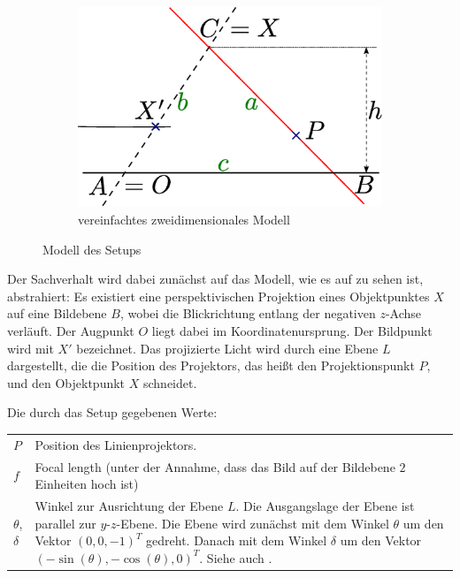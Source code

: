 \documentclass[ngerman,a4paper,parskip=half]{scrartcl}
\begin{document}
\begin{figure}
	\begin{subfigure}{0.45\textwidth}
		\includegraphics[width=\textwidth]{includes/triangulation2d}
		\caption{vereinfachtes zweidimensionales Modell}
		\label{fig:triangulation2d}
	\end{subfigure}
	\caption{Modell des Setups}
\end{figure}

Der Sachverhalt wird dabei zunächst auf das Modell, wie es auf  zu sehen ist, abstrahiert: Es existiert eine perspektivischen Projektion eines Objektpunktes $X$ auf eine Bildebene $B$, wobei die Blickrichtung entlang der negativen $z$-Achse verläuft. Der Augpunkt $O$ liegt dabei im Koordinatenursprung. Der Bildpunkt wird mit $X'$ bezeichnet. Das projizierte Licht wird durch eine Ebene $L$ dargestellt, die die Position des Projektors, das heißt den Projektionspunkt $P$, und den Objektpunkt $X$ schneidet.

Die durch das Setup gegebenen Werte:

\begin{tabular}{lp{12cm}}
	$P$                &
		Position des Linienprojektors.\\[0.5em]
	$f$                &
		Focal length
		(unter der Annahme, dass das Bild auf der Bildebene $2$ Einheiten hoch ist)\\[0.5em]
	$\theta$,$\delta$  &
		Winkel zur Ausrichtung der Ebene $L$. Die Ausgangslage der Ebene ist parallel zur $y$-$z$-Ebene. Die Ebene wird zunächst mit dem Winkel $\theta$ um den Vektor {\color{red} $(0,0,-1)^T$} gedreht. Danach mit dem Winkel $\delta$ um den Vektor {\color{red} $(-\sin(\theta), -\cos(\theta), 0)^T$}. Siehe auch \Fref{fig:triangulation_skew_pitch}.
\end{tabular}
\end{document}

